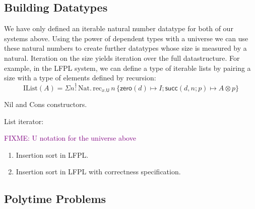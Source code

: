 \documentclass[acmsmall,review,screen,anonymous]{acmart}
\newcommand{\tyNat}{\mathrm{Nat}}
\newcommand{\conZero}{\mathsf{zero}}
\newcommand{\conSucc}{\mathsf{succ}}
\newcommand{\bob}[1]{\textcolor{purple}{FIXME: #1}}
\begin{document}

\subsection{Building Datatypes}
\label{sec:prog-datatypes}

We have only defined an iterable natural number datatype for both of
our systems above. Using the power of dependent types with a universe
we can use these natural numbers to create further datatypes whose
size is measured by a natural. Iteration on the size yields iteration
over the full datastructure. For example, in the LFPL system, we can
define a type of iterable lists by pairing a size with a type of
elements defined by recursion:
\begin{displaymath}
  \mathrm{IList}(A) = \Sigma n \stackrel1: \tyNat.\,\mathrm{rec}_{x.\mathsf{U}}\,n\,\{ \conZero(d) \mapsto I; \conSucc(d,n;p) \mapsto A \otimes p \}
\end{displaymath}

Nil and Cons constructors.

List iterator:


\bob{U notation for the universe above}


\begin{enumerate}
\item Insertion sort in LFPL.
\item Insertion sort in LFPL with correctness specification.
\end{enumerate}

\subsection{Polytime Problems}
\label{sec:polytime-problems}
\end{document}

